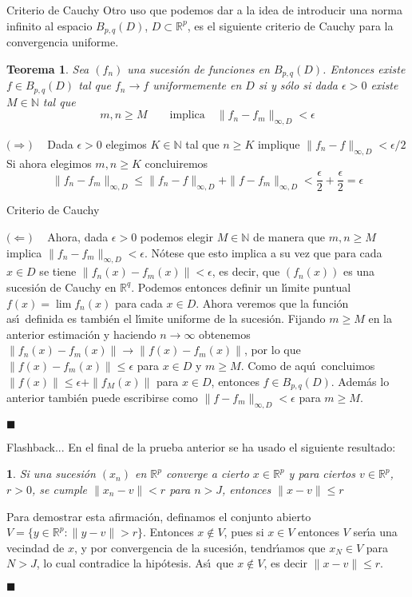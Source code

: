 \documentclass[xcolor=dvipsnames,10pt,handout, draft]{beamer}
\newcommand{\nz}{\mathbb N}
\newcommand{\rzp}{\mathbb R^{p}}
\newcommand{\rzq}{\mathbb R^{q}}
\newtheorem*{afirma}{}
\newtheorem*{teo}{Teorema}
\begin{document}
\begin{frame}{Criterio de Cauchy}
Otro uso que podemos dar a la idea de introducir una norma infinito al espacio $B_{p,q}(D)$, $D\subset\rzp$, es el siguiente criterio de Cauchy para la convergencia uniforme. \pause
\begin{teo}
Sea $(f_n)$ una sucesi\'on de funciones en $B_{p,q}(D)$. Entonces existe $f\in B_{p,q}(D)$ tal que $f_n\to f$ uniformemente en $D$ si y s\'olo si dada $\epsilon>0$ existe $M\in\nz$ tal que 
$$m,n\geq M\qquad\text{implica}\quad\|f_n-f_m\|_{\infty,D}<\epsilon$$
\end{teo}\pause

{\color{green!59!black} $\big(\Rightarrow\big)\quad$} \pause Dada $\epsilon>0$ elegimos $K\in\nz$ tal que $n\geq K$ implique $\|f_n-f\|_{\infty,D}<\epsilon/2$
\pause\vskip4pt
Si ahora elegimos $m,n\geq K$ concluiremos
$$\|f_n-f_m\|_{\infty,D}\leq \|f_n-f\|_{\infty,D}+\|f-f_m\|_{\infty,D}<\frac{\epsilon}{2}+\frac{\epsilon}{2}=\epsilon$$
\end{frame}

\begin{frame}{Criterio de Cauchy}

{\color{green!59!black} $\big(\Leftarrow\big)\quad$} \pause Ahora, dada $\epsilon>0$ podemos elegir $M\in\nz$ de manera que $m,n\geq M$ implica $\|f_n-f_m\|_{\infty,D}<\epsilon$.
\pause\vskip4pt
N\'otese que esto implica a su vez que para cada $x\in D$ se tiene $\|f_n(x)-f_m(x)\|<\epsilon$, \pause es decir, que $(f_n(x))$ es una sucesi\'on de Cauchy en $\rzq$.
Podemos entonces definir un l\'\i mite puntual $f(x)=\lim f_n(x)$ para cada $x\in D$. \pause Ahora veremos que la funci\'on as\'\i\ definida es tambi\'en el l\'\i mite uniforme de la sucesi\'on. 
\pause\vskip4pt
Fijando $m\geq M$ en la anterior estimaci\'on y haciendo $n\to\infty$ obtenemos $\|f_n(x)-f_m(x)\|\to\|f(x)-f_m(x)\|$, \pause por lo que $\|f(x)-f_m(x)\|\leq\epsilon$ para $x\in D$ y $m\geq M$. \pause Como de aqu\'\i\ concluimos $\|f(x)\|\leq\epsilon+\|f_M(x)\|$ para $x\in D$, entonces $f\in B_{p,q}(D)$. 
\pause\vskip4pt
Adem\'as lo anterior tambi\'en puede escribirse como $\|f-f_m\|_{\infty,D}<\epsilon$ para $m\geq M$.

\hfill$\blacksquare$
\end{frame}

\begin{frame}{Flashback...}
En el final de la prueba anterior se ha usado el siguiente resultado:

\begin{afirma}
Si una sucesi\'on $(x_n)$ en $\rzp$ converge a cierto $x\in\rzp$ y para ciertos $v\in\rzp$, $r>0$, se cumple $\|x_n-v\|<r$ para $n>J$, entonces $\|x-v\|\leq r$
\end{afirma}\pause

Para demostrar esta afirmaci\'on, definamos el conjunto abierto $V=\big\{y\in\rzp:\|y-v\|>r\big\}$. \pause Entonces $x\not\in V$, pues si $x\in V$ entonces $V$ ser\'\i a una vecindad de $x$, y por convergencia de la sucesi\'on, tendr\'\i amos que $x_N\in V$ para $N>J$, lo cual contradice la hip\'otesis. \pause As\'\i\ que $x\not\in V$, es decir $\|x-v\|\leq r$.

\hfill$\blacksquare$
\end{frame}
\end{document}
